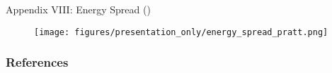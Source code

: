 \begin{frame}{Appendix VIII: Energy Spread (\cite{prat2022energy})}
    \begin{figure}
        \begin{center}
            \texttt{[image: figures/presentation\_only/energy\_spread\_pratt.png]}
        \end{center}
            \label{fig:meshsize_test_VICO}
    \end{figure}
\end{frame}

 \begin{frame}[allowframebreaks]
     \frametitle{References}
     
 \end{frame}


